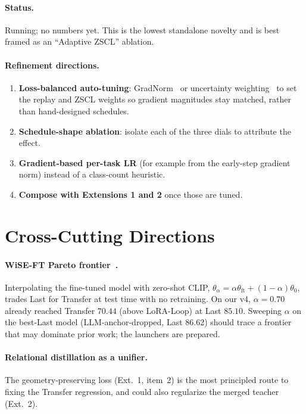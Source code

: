 \documentclass[11pt]{article}
\begin{document}
\paragraph{Status.} Running; no numbers yet. This is the lowest standalone novelty and is best framed
as an ``Adaptive ZSCL'' ablation.

\paragraph{Refinement directions.}
\begin{enumerate}
  \item \textbf{Loss-balanced auto-tuning}: GradNorm~\cite{gradnorm} or uncertainty
        weighting~\cite{uncertainty} to set the replay and ZSCL weights so gradient magnitudes stay
        matched, rather than hand-designed schedules.
  \item \textbf{Schedule-shape ablation}: isolate each of the three dials to attribute the effect.
  \item \textbf{Gradient-based per-task LR} (for example from the early-step gradient norm) instead of
        a class-count heuristic.
  \item \textbf{Compose with Extensions 1 and 2} once those are tuned.
\end{enumerate}

\section{Cross-Cutting Directions}
\label{sec:cross}

\paragraph{WiSE-FT Pareto frontier~\cite{wiseft}.} Interpolating the fine-tuned model with zero-shot
CLIP, $\theta_\alpha=\alpha\theta_{\text{ft}}+(1-\alpha)\theta_{0}$, trades Last for Transfer at test
time with no retraining. On our v4, $\alpha{=}0.70$ already reached Transfer $70.44$ (above LoRA-Loop)
at Last $85.10$. Sweeping $\alpha$ on the best-Last model (LLM-anchor-dropped, Last 86.62) should
trace a frontier that may dominate prior work; the launchers are prepared.

\paragraph{Relational distillation as a unifier.} The geometry-preserving loss (Ext.~1, item~2) is
the most principled route to fixing the Transfer regression, and could also regularize the merged
teacher (Ext.~2).
\end{document}
